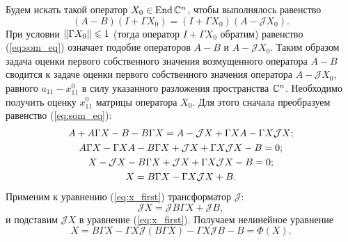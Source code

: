 
Будем искать такой оператор $X_0 \in \operatorname{End}\mathbb{C}^n$, чтобы выполнялось равенство
\begin{equation}\label{eq:som_eq}
	(A-B)(I + \Gamma X_0) = (I + \Gamma X_0)(A-\mathcal{J}X_0).
\end{equation}
При условии $\left\|\Gamma X_0\right\| \leqslant 1$ (тогда оператор $I + \Gamma X_0$ обратим) равенство (\ref{eq:som_eq}) означает подобие операторов $A-B$ и $A-\mathcal{J} X_0$. Таким образом задача оценки первого собственного значения возмущенного оператора $A-B$ сводится к задаче оценки первого собственного значения оператора $A-\mathcal{J}X_0$, равного $a_{11} - x^{0}_{11}$ в силу указанного разложения пространства $\mathbb{C}^n$. Необходимо получить оценку $x^{0}_{11}$ матрицы оператора $X_0$. Для этого сначала преобразуем равенство (\ref{eq:som_eq}):
\begin{gather}
	A + A\Gamma X - B - B\Gamma X = A - \mathcal{J}X + \Gamma X A - \Gamma X \mathcal{J}X; \notag \\
	A\Gamma X - \Gamma X A - B\Gamma X + \mathcal{J}X + \Gamma X \mathcal{J}X - B = 0; \notag \\
	X - \mathcal{J}X - B\Gamma X + \mathcal{J}X + \Gamma X \mathcal{J}X - B = 0;  \notag \\
	X = B\Gamma X - \Gamma X \mathcal{J}X + B. \label{eq:x_first}
\end{gather}
Применим к уравнению (\ref{eq:x_first}) трансформатор $\mathcal{J}$:
$$
	\mathcal{J}X = \mathcal{J}B\Gamma X + \mathcal{J}B,
$$ 
и подставим $\mathcal{J}X$ в уравнение (\ref{eq:x_first}). Получаем нелинейное уравнение
\begin{equation}\label{eq:x_main}
	X = B\Gamma X - \Gamma X \mathcal{J}(B\Gamma X) - \Gamma X \mathcal{J}B - B = \Phi(X).
\end{equation}

